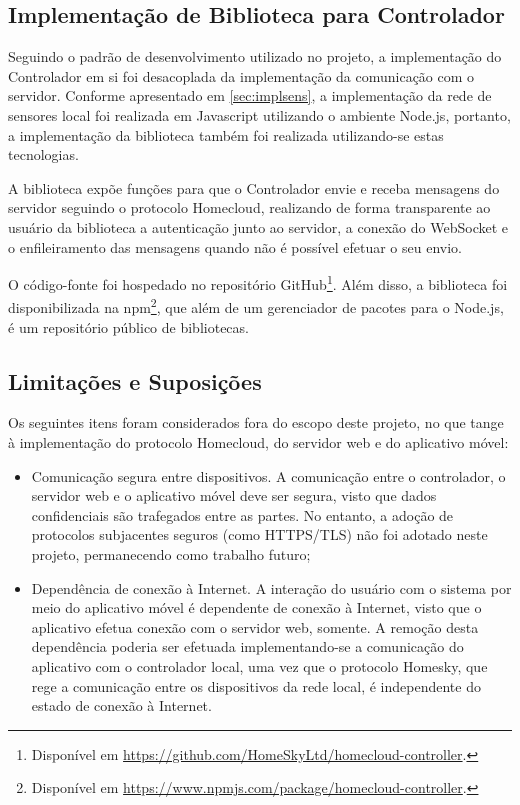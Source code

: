 \subsection{Implementação de Biblioteca para Controlador}
Seguindo o padrão de desenvolvimento utilizado no projeto, a implementação
do Controlador em si foi desacoplada da implementação da comunicação
com o servidor. Conforme apresentado em \ref{sec:implsens}, a implementação
da rede de sensores local foi realizada em Javascript utilizando o
ambiente Node.js, portanto, a implementação da biblioteca também foi
realizada utilizando-se estas tecnologias.

A biblioteca expõe funções para que o Controlador envie e receba mensagens do servidor seguindo o protocolo Homecloud, realizando de forma transparente ao usuário da biblioteca a autenticação junto ao servidor, a conexão do WebSocket e o enfileiramento das mensagens quando não é possível efetuar o seu envio.

O código-fonte foi hospedado no repositório GitHub\footnote{Disponível em \url{https://github.com/HomeSkyLtd/homecloud-controller}.}. Além disso, a 
biblioteca foi disponibilizada na npm\footnote{Disponível em \url{https://www.npmjs.com/package/homecloud-controller}.}, que além de um gerenciador de pacotes para o Node.js, é um repositório público de bibliotecas.

\subsection{Limitações e Suposições} \label{subsec:limit_serv_app}
Os seguintes itens foram considerados fora do escopo deste projeto, no que tange à implementação do protocolo Homecloud, do servidor web e do aplicativo móvel:

\begin{itemize}
	\item Comunicação segura entre dispositivos. A comunicação entre o controlador, o servidor web e o aplicativo móvel deve ser segura, visto que dados confidenciais são trafegados entre as partes. No entanto, a adoção de protocolos subjacentes seguros (como HTTPS/TLS) não foi adotado neste projeto, permanecendo como trabalho futuro;
	\item Dependência de conexão à Internet. A interação do usuário com o sistema por meio do aplicativo móvel é dependente de conexão à Internet, visto que o aplicativo efetua conexão com o servidor web, somente. A remoção desta dependência poderia ser efetuada implementando-se a comunicação do aplicativo com o controlador local, uma vez que o protocolo Homesky, que rege a comunicação entre os dispositivos da rede local, é independente do estado de conexão à Internet.
\end{itemize}


